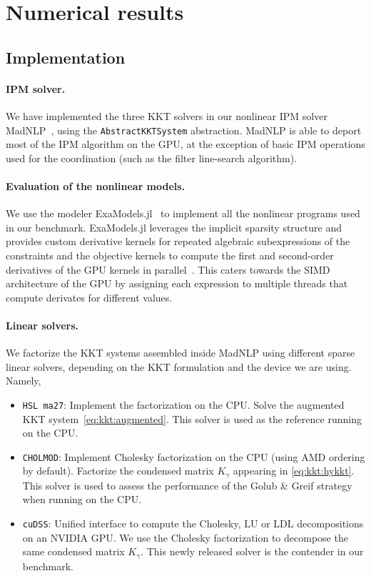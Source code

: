 \section{Numerical results}

\subsection{Implementation}

\paragraph{IPM solver.}
We have implemented the three KKT solvers in our nonlinear IPM solver
MadNLP~\cite{shin2021graph}, using the {\tt AbstractKKTSystem} abstraction.
MadNLP is able to deport most of the IPM algorithm on the GPU,
at the exception of basic IPM operations used for the coordination
(such as the filter line-search algorithm).

\paragraph{Evaluation of the nonlinear models.}
We use the modeler ExaModels.jl~\cite{shin2023accelerating} to implement all the
nonlinear programs used in our benchmark. ExaModels.jl leverages the implicit
sparsity structure and provides custom derivative kernels for repeated
algebraic subexpressions of the constraints and the objective kernels to compute
the first and second-order derivatives of the GPU kernels in
parallel~\cite{bischof1991exploiting,enzyme2021}. This caters towards
the SIMD architecture of the GPU by assigning each expression to multiple
threads that compute derivates for different values.

\paragraph{Linear solvers.}
We factorize the KKT systems assembled inside MadNLP
using different sparse linear solvers, depending on the KKT formulation
and the device we are using. Namely,
\begin{itemize}
  \item {\tt HSL ma27}: Implement the \lblt factorization
    on the CPU. Solve the augmented KKT system~\eqref{eq:kkt:augmented}.
    This solver is used as the reference running on the CPU.
  \item {\tt CHOLMOD}: Implement Cholesky factorization on the CPU
    (using AMD ordering by default). Factorize the condensed
    matrix $K_\gamma$ appearing in \eqref{eq:kkt:hykkt}.
    This solver is used to assess the performance of the
    Golub \& Greif strategy when running on the CPU.
  \item {\tt cuDSS}: Unified interface to compute the Cholesky,
    LU or LDL decompositions on an NVIDIA GPU. We use the Cholesky
    factorization to decompose the same condensed matrix $K_\gamma$.
    This newly released solver is the contender in our benchmark.
\end{itemize}

